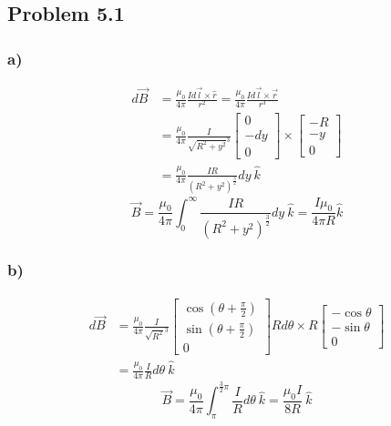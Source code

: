\documentclass[../homework.tex]{subfiles}
\begin{document}
\subsection{Problem 5.1}
\subsubsection*{a)}
\begin{align*}
    d\vec{B} &= \frac{\mu_0}{4\pi} \frac{I d\vec{l} \times \hat{r}}{r^2} = \frac{\mu_0}{4\pi}\frac{I d\vec{l} \times \vec{r}}{r^3} \\
    &= \frac{\mu_0}{4\pi}\frac{I}{\sqrt{R^2 + y^2}^3}
    \begin{bmatrix}
        0 \\
        -dy  \\
        0
    \end{bmatrix} \times
    \begin{bmatrix}
        -R \\
        -y  \\
        0
    \end{bmatrix} \\
    &= \frac{\mu_0}{4\pi}\frac{IR}{(R^2 + y^2)^\frac{3}{2}} dy~\hat{k}
\end{align*}
\begin{equation*}
    \vec{B} = \frac{\mu_0}{4\pi}\int_{0}^{\infty} \frac{IR}{(R^2 + y^2)^\frac{3}{2}} dy~\hat{k} = \frac{I\mu_0}{4\pi R}\hat{k}
\end{equation*}

\subsubsection*{b)}
\begin{align*}
    d\vec{B} &= \frac{\mu_0}{4\pi}\frac{I}{\sqrt{R^2}^3}
    \begin{bmatrix}
        \cos(\theta + \frac{\pi}{2}) \\
        \sin(\theta + \frac{\pi}{2})  \\
        0
    \end{bmatrix} R d\theta \times R
    \begin{bmatrix}
        -\cos \theta \\
        -\sin \theta  \\
        0
    \end{bmatrix} \\
    &= \frac{\mu_0}{4\pi}\frac{I}{R} d\theta~\hat{k}
\end{align*}
\begin{equation*}
    \vec{B} = \frac{\mu_0}{4\pi}\int_{\pi}^{\frac{3}{2}\pi} \frac{I}{R} d\theta~\hat{k} = \frac{\mu_0I}{8 R}~\hat{k}
\end{equation*}
\end{document}
